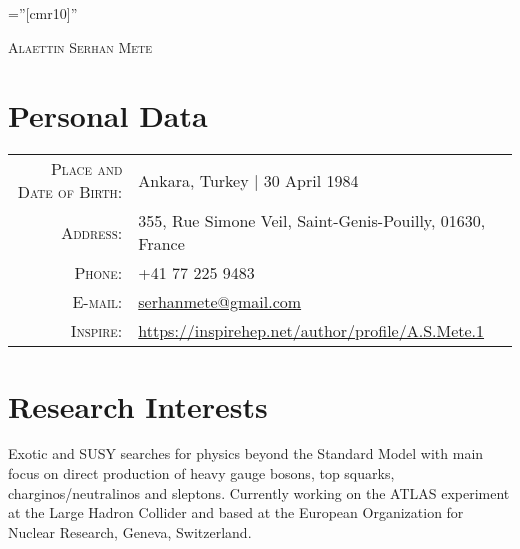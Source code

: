 \documentclass[a4paper,10pt]{article}
\begin{document}

\pagestyle{empty} %

\font\fb=''[cmr10]'' %

\par{\centering
		{\Huge \textsc{Alaettin Serhan Mete}
	}\bigskip\par}

\section{Personal Data}

\begin{tabular}{rl}
    \textsc{Place and Date of Birth:} 			& Ankara, Turkey  | 30 April 1984 							\\
    \textsc{Address:}   					& 355, Rue Simone Veil, Saint-Genis-Pouilly, 01630, France		\\
    \textsc{Phone:}     						& +41 77 225 9483										\\
    \textsc{E-mail:}     						& \href{mailto:serhanmete@gmail.com}{serhanmete@gmail.com}	\\
    \textsc{Inspire:}						& \href{https://inspirehep.net/author/profile/A.S.Mete.1}{https://inspirehep.net/author/profile/A.S.Mete.1}
\end{tabular}

\vspace{3mm}
\section{Research Interests}
Exotic and SUSY searches for physics beyond the Standard Model with main focus on direct production of 
heavy gauge bosons, top squarks, charginos/neutralinos and sleptons. 
Currently working on the ATLAS experiment at the Large Hadron Collider and based at 
the European Organization for Nuclear Research, Geneva, Switzerland.
\end{document}
